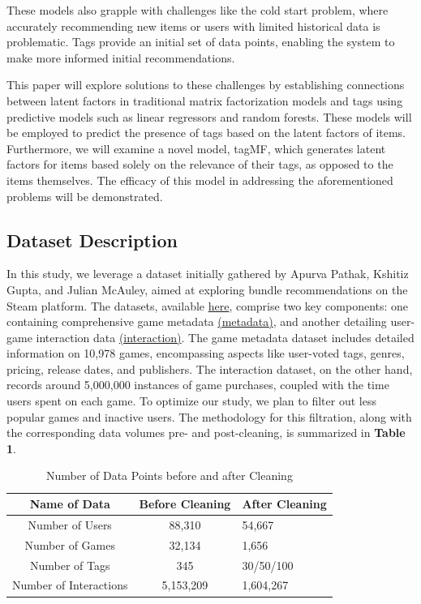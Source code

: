 \documentclass[sigplan,screen]{acmart}
\begin{document}
These models also grapple with challenges like the cold start problem, where accurately recommending new items or users with limited historical data is problematic. Tags provide an initial set of data points, enabling the system to make more informed initial recommendations.

This paper will explore solutions to these challenges by establishing connections between latent factors in traditional matrix factorization models and tags using predictive models such as linear regressors and random forests. These models will be employed to predict the presence of tags based on the latent factors of items. Furthermore, we will examine a novel model, tagMF\cite{LOEPP201921}, which generates latent factors for items based solely on the relevance of their tags, as opposed to the items themselves. The efficacy of this model in addressing the aforementioned problems will be demonstrated.

\subsection{Dataset Description}
In this study, we leverage a dataset initially gathered by Apurva Pathak, Kshitiz Gupta, and Julian McAuley, aimed at exploring bundle recommendations on the Steam platform\cite{Pathak17}. The datasets, available \href{https://cseweb.ucsd.edu/~jmcauley/datasets.html#steam_data}{here}, comprise two key components: one containing comprehensive game metadata \href{https://cseweb.ucsd.edu/~wckang/steam_games.json.gz}{(metadata)}, and another detailing user-game interaction data \href{https://datarepo.eng.ucsd.edu/mcauley_group/data/steam/australian_users_items.json.gz}{(interaction)}. The game metadata dataset includes detailed information on 10,978 games, encompassing aspects like user-voted tags, genres, pricing, release dates, and publishers. The interaction dataset, on the other hand, records around 5,000,000 instances of game purchases, coupled with the time users spent on each game. To optimize our study, we plan to filter out less popular games and inactive users. The methodology for this filtration, along with the corresponding data volumes pre- and post-cleaning, is summarized in \textbf{Table 1}.

\begin{table}
  \caption{Number of Data Points before and after Cleaning}
  \label{tab:freq}
  \begin{tabular}{ccl}
    \toprule
    Name of Data&Before Cleaning&After Cleaning\\
    \midrule
    Number of Users & 88,310 & 54,667\\
    Number of Games  & 32,134 & 1,656\\
    Number of Tags & 345 & 30/50/100\\
    Number of Interactions & 5,153,209 & 1,604,267\\
  \bottomrule
\end{tabular}
\end{table}
\end{document}
